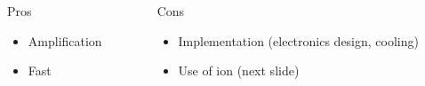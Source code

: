 \begin{frame}
  \begin{columns}[T]
    \begin{column}{0.45\textwidth}
      \begin{block}{Pros}
        \begin{itemize}
          \item Amplification
          \item Fast
        \end{itemize}
      \end{block}
    \end{column}
    \begin{column}{0.45\textwidth}
      \begin{block}{Cons}
        \begin{itemize}
          \item Implementation (electronics design, cooling)
          \item Use of ion (next slide)
        \end{itemize}
      \end{block}
    \end{column}
  \end{columns}
\end{frame}


